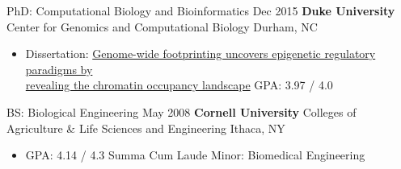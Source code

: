 
\begin{resentries}

  \resentrybeta
	{PhD: Computational Biology and Bioinformatics}
	{Dec 2015}
	{\textbf{Duke University} \xspace \bullet \xspace \xspace Center for Genomics and Computational Biology}
	{Durham, NC}
    {
      \begin{itemize}[leftmargin=*, itemsep=1.5mm] %
		\item{Dissertation: \href{https://dukespace.lib.duke.edu/dspace/handle/10161/11371}{\color{blue} Genome-wide footprinting uncovers epigenetic regulatory paradigms by\\ revealing the chromatin occupancy landscape} \xspace \bullet \xspace \xspace GPA: 3.97 / 4.0} 
      \end{itemize}
    }

  \resentrybeta
	{BS: Biological Engineering}
	{May 2008}
	{\textbf{Cornell University} \xspace \bullet \xspace \xspace Colleges of Agriculture \& Life Sciences and Engineering}
	{Ithaca, NY}
    {
      \begin{itemize}[leftmargin=*, itemsep=1.5mm] %
		\item{GPA: 4.14 / 4.3 \xspace \bullet \xspace \xspace Summa Cum Laude \xspace \bullet \xspace \xspace Minor: Biomedical Engineering}
      \end{itemize}
    }
\end{resentries}
